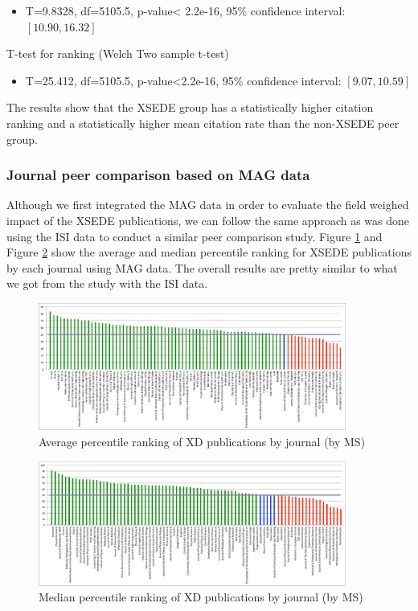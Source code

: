 \documentclass{sig-alternate}
\begin{document}
\begin{itemize}
\item T=9.8328, df=5105.5, p-value< 2.2e-16, 95\% confidence interval: $[10.90, 16.32]$
\end{itemize}

T-test for ranking (Welch Two sample t-test)
\begin{itemize}
\item T=25.412, df=5105.5, p-value<2.2e-16, 95\% confidence interval: $[9.07, 10.59]$
\end{itemize}


The results show that the XSEDE group has a statistically higher
citation ranking and a statistically higher mean citation rate than
the non-XSEDE peer group.

\subsubsection{Journal peer comparison based on MAG data}

Although we first integrated the MAG data in order to evaluate the
field weighed impact of the XSEDE publications, we can follow the same
approach as was done using the ISI data to conduct a similar peer
comparison study. Figure \ref{F:ms_peers_byj_mean} and Figure
\ref{F:ms_peers_byj_median} show the average and median percentile
ranking for XSEDE publications by each journal using MAG data. The
overall results are pretty similar to what we got from the study with
the ISI data.

\begin{figure}[htb!]
  \centering
    \includegraphics[width=0.9\textwidth]{images/ms_peers_byj_mean_10.pdf}
    \caption{Average percentile ranking of XD publications by journal (by MS)}
    \label{F:ms_peers_byj_mean}
\end{figure}

\begin{figure}[htb!]
  \centering
    \includegraphics[width=0.9\textwidth]{images/ms_peers_byj_median_10.pdf}
    \caption{Median percentile ranking of XD publications by journal (by MS)}
    \label{F:ms_peers_byj_median}
\end{figure}
\end{document}
